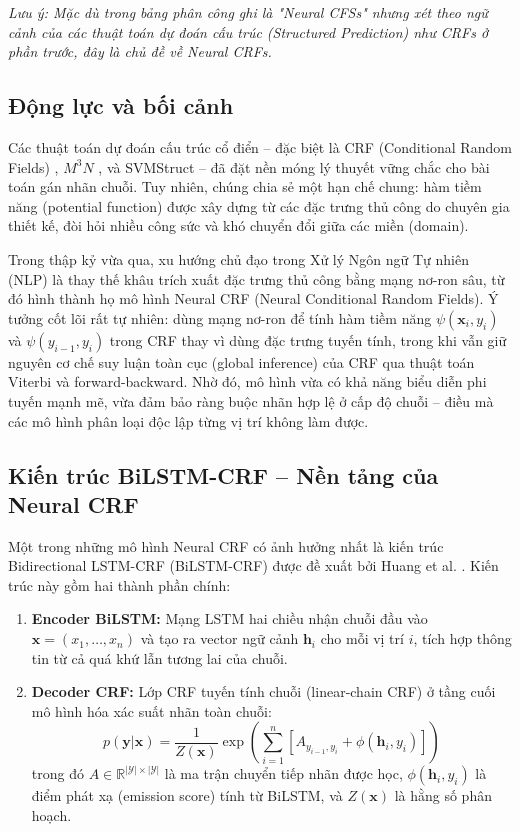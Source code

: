 \begin{expandbox}
\textit{Lưu ý: Mặc dù trong bảng phân công ghi là "Neural CFSs" nhưng xét theo ngữ cảnh của các thuật toán dự đoán cấu trúc (Structured Prediction) như CRFs ở phần trước, đây là chủ đề về Neural CRFs.}

\subsection{Động lực và bối cảnh}
\label{ssec:neural_crf_motivation}
Các thuật toán dự đoán cấu trúc cổ điển -- đặc biệt là CRF (Conditional Random Fields) \cite{lafferty2001conditional}, $M^3N$ \cite{taskar2003max}, và SVMStruct \cite{tsochantaridis2005large} -- đã đặt nền móng lý thuyết vững chắc cho bài toán gán nhãn chuỗi. Tuy nhiên, chúng chia sẻ một hạn chế chung: hàm tiềm năng (potential function) được xây dựng từ các đặc trưng thủ công do chuyên gia thiết kế, đòi hỏi nhiều công sức và khó chuyển đổi giữa các miền (domain).

Trong thập kỷ vừa qua, xu hướng chủ đạo trong Xử lý Ngôn ngữ Tự nhiên (NLP) là thay thế khâu trích xuất đặc trưng thủ công bằng mạng nơ-ron sâu, từ đó hình thành họ mô hình Neural CRF (Neural Conditional Random Fields). Ý tưởng cốt lõi rất tự nhiên: dùng mạng nơ-ron để tính hàm tiềm năng $\psi(\bm{x}_i, y_i)$ và $\psi(y_{i-1}, y_i)$ trong CRF thay vì dùng đặc trưng tuyến tính, trong khi vẫn giữ nguyên cơ chế suy luận toàn cục (global inference) của CRF qua thuật toán Viterbi và forward-backward. Nhờ đó, mô hình vừa có khả năng biểu diễn phi tuyến mạnh mẽ, vừa đảm bảo ràng buộc nhãn hợp lệ ở cấp độ chuỗi -- điều mà các mô hình phân loại độc lập từng vị trí không làm được.

\subsection{Kiến trúc BiLSTM-CRF -- Nền tảng của Neural CRF}
\label{ssec:bilstm_crf}
Một trong những mô hình Neural CRF có ảnh hưởng nhất là kiến trúc Bidirectional LSTM-CRF (BiLSTM-CRF) được đề xuất bởi Huang et al. \cite{huang2015bidirectional}. Kiến trúc này gồm hai thành phần chính:
\begin{enumerate}[leftmargin=2em]
    \item \textbf{Encoder BiLSTM:} Mạng LSTM hai chiều nhận chuỗi đầu vào $\bm{x} = (x_1, \ldots, x_n)$ và tạo ra vector ngữ cảnh $\bm{h}_i$ cho mỗi vị trí $i$, tích hợp thông tin từ cả quá khứ lẫn tương lai của chuỗi.
    \item \textbf{Decoder CRF:} Lớp CRF tuyến tính chuỗi (linear-chain CRF) ở tầng cuối mô hình hóa xác suất nhãn toàn chuỗi:
    \begin{equation}
        p(\bm{y}|\bm{x}) = \frac{1}{Z(\bm{x})} \exp\left( \sum_{i=1}^{n} \left[ A_{y_{i-1}, y_i} + \phi(\bm{h}_i, y_i) \right] \right)
        \label{eq:bilstm_crf_prob}
    \end{equation}
    trong đó $A \in \mathbb{R}^{|\mathcal{Y}| \times |\mathcal{Y}|}$ là ma trận chuyển tiếp nhãn được học, $\phi(\bm{h}_i, y_i)$ là điểm phát xạ (emission score) tính từ BiLSTM, và $Z(\bm{x})$ là hằng số phân hoạch.
\end{enumerate}


\end{expandbox}

